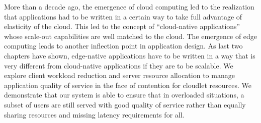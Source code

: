 More than a decade ago, the emergence of cloud computing led to the realization
that applications had to be written in a certain way to take full advantage of
elasticity of the cloud.  This led to the concept of ``cloud-native
applications'' whose scale-out capabilities are well matched to the cloud. The
emergence of edge computing leads to another inflection point in application
design.  As last two chapters have shown, edge-native applications have to be
written in a way that is very different from cloud-native applications if they
are to be scalable. We explore client workload reduction and server resource
allocation to manage application quality of service in the face of contention
for cloudlet resources. We demonstrate that our system is able to ensure that in
overloaded situations, a subset of users are still served with good quality of
service rather than equally sharing resources and missing latency requirements
for all.


